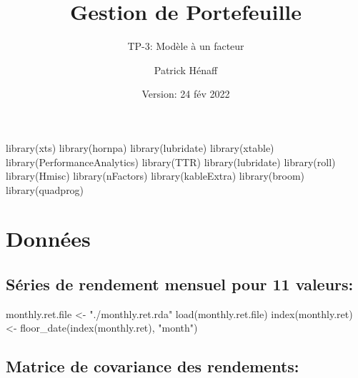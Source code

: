 \documentclass[
]{article}
\title{Gestion de Portefeuille}
\subtitle{TP-3: Modèle à un facteur}
\author{Patrick Hénaff}
\date{Version: 24 fév 2022}
\newenvironment{Shaded}{\begin{snugshade}}{\end{snugshade}}
\newcommand{\FunctionTok}[1]{\textcolor[rgb]{0.00,0.00,0.00}{#1}}
\newcommand{\NormalTok}[1]{#1}
\newcommand{\OtherTok}[1]{\textcolor[rgb]{0.56,0.35,0.01}{#1}}
\newcommand{\StringTok}[1]{\textcolor[rgb]{0.31,0.60,0.02}{#1}}
\begin{document}
\maketitle

\begin{Shaded}
\begin{Highlighting}[]
\FunctionTok{library}\NormalTok{(xts)}
\FunctionTok{library}\NormalTok{(hornpa)}
\FunctionTok{library}\NormalTok{(lubridate)}
\FunctionTok{library}\NormalTok{(xtable)}
\FunctionTok{library}\NormalTok{(PerformanceAnalytics)}
\FunctionTok{library}\NormalTok{(TTR)}
\FunctionTok{library}\NormalTok{(lubridate)}
\FunctionTok{library}\NormalTok{(roll)}
\FunctionTok{library}\NormalTok{(Hmisc)}
\FunctionTok{library}\NormalTok{(nFactors)}
\FunctionTok{library}\NormalTok{(kableExtra)}
\FunctionTok{library}\NormalTok{(broom)}
\FunctionTok{library}\NormalTok{(quadprog)}
\end{Highlighting}
\end{Shaded}

\hypertarget{donnuxe9es}{%
\section{Données}\label{donnuxe9es}}

\hypertarget{suxe9ries-de-rendement-mensuel-pour-11-valeurs}{%
\subsection{Séries de rendement mensuel pour 11
valeurs:}\label{suxe9ries-de-rendement-mensuel-pour-11-valeurs}}

\begin{Shaded}
\begin{Highlighting}[]
\NormalTok{monthly.ret.file }\OtherTok{\textless{}{-}} \StringTok{"./monthly.ret.rda"}
\FunctionTok{load}\NormalTok{(monthly.ret.file)}
\FunctionTok{index}\NormalTok{(monthly.ret) }\OtherTok{\textless{}{-}} \FunctionTok{floor\_date}\NormalTok{(}\FunctionTok{index}\NormalTok{(monthly.ret), }\StringTok{"month"}\NormalTok{)}
\end{Highlighting}
\end{Shaded}

\hypertarget{matrice-de-covariance-des-rendements}{%
\subsection{Matrice de covariance des
rendements:}\label{matrice-de-covariance-des-rendements}}
\end{document}
